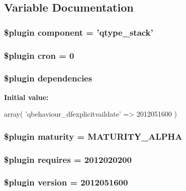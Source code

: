 \subsection{Variable Documentation}
\hypertarget{version_8php_a27dc7e2c13f48a05e56e0d3138fe3c82}{
\subsubsection[{component}]{\setlength{\rightskip}{0pt plus 5cm}\$plugin {\bf component} = '{\bf qtype\_\-stack}'}}
\label{version_8php_a27dc7e2c13f48a05e56e0d3138fe3c82}
\hypertarget{version_8php_ac5be73ff43d202617c9da25568c37ef5}{
\subsubsection[{cron}]{\setlength{\rightskip}{0pt plus 5cm}\$plugin {\bf cron} = 0}}
\label{version_8php_ac5be73ff43d202617c9da25568c37ef5}
\hypertarget{version_8php_a816e85fbd31aa493f1f3c61082b10b1a}{
\subsubsection[{dependencies}]{\setlength{\rightskip}{0pt plus 5cm}\$plugin {\bf dependencies}}}
\label{version_8php_a816e85fbd31aa493f1f3c61082b10b1a}
{\bfseries Initial value:}
\begin{DoxyCode}
 array(
    'qbehaviour_dfexplicitvaildate' => 2012051600
)
\end{DoxyCode}
\hypertarget{version_8php_a32ceacc498b265853073aba2281015e5}{
\subsubsection[{maturity}]{\setlength{\rightskip}{0pt plus 5cm}\$plugin {\bf maturity} = MATURITY\_\-ALPHA}}
\label{version_8php_a32ceacc498b265853073aba2281015e5}
\hypertarget{version_8php_a9c9f657b2cd3e37b286e8b1f70d99bda}{
\subsubsection[{requires}]{\setlength{\rightskip}{0pt plus 5cm}\$plugin {\bf requires} = 2012020200}}
\label{version_8php_a9c9f657b2cd3e37b286e8b1f70d99bda}
\hypertarget{version_8php_a92a3fd99b37c9cbd65c4aead816b3a83}{
\subsubsection[{version}]{\setlength{\rightskip}{0pt plus 5cm}\$plugin {\bf version} = 2012051600}}
\label{version_8php_a92a3fd99b37c9cbd65c4aead816b3a83}
